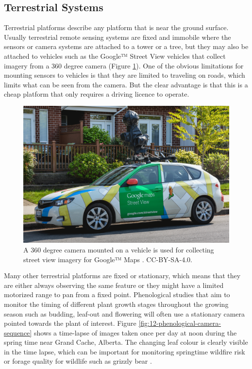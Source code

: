 \documentclass[
]{book}
\begin{document}
\subsection{Terrestrial Systems}\label{terrestrial-systems}

Terrestrial platforms describe any platform that is near the ground surface. Usually terrestrial remote sensing systems are fixed and immobile where the sensors or camera systems are attached to a tower or a tree, but they may also be attached to vehicles such as the Google™ Street View vehicles that collect imagery from a 360 degree camera (Figure \ref{fig:12-google-street-view-car}). One of the obvious limitations for mounting sensors to vehicles is that they are limited to traveling on roads, which limits what can be seen from the camera. But the clear advantage is that this is a cheap platform that only requires a driving licence to operate.



\begin{figure}
\includegraphics[width=0.75\linewidth]{images/12-google-street-view-car} \caption{A 360 degree camera mounted on a vehicle is used for collecting street view imagery for Google™ Maps \citep{leggett_google_2014}. CC-BY-SA-4.0.}\label{fig:12-google-street-view-car}
\end{figure}

Many other terrestrial platforms are fixed or stationary, which means that they are either always observing the same feature or they might have a limited motorized range to pan from a fixed point. Phenological studies that aim to monitor the timing of different plant growth stages throughout the growing season such as budding, leaf-out and flowering will often use a stationary camera pointed towards the plant of interest. Figure \ref{fig:12-phenological-camera-sequence} shows a time-lapse of images taken once per day at noon during the spring time near Grand Cache, Alberta. The changing leaf colour is clearly visible in the time lapse, which can be important for monitoring springtime wildfire risk \citep{pickell_early_2017} or forage quality for wildlife such as grizzly bear \citep{bater_using_2010}.
\end{document}
